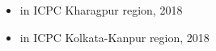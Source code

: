  

\begin{itemize}
    \item {} in ICPC Kharagpur region, 2018
    \item {} in ICPC Kolkata-Kanpur region, 2018
 \end{itemize}
